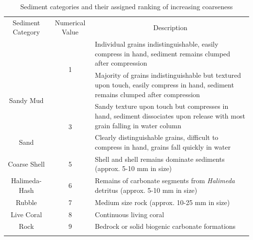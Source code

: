 \begin{table}[ht]
  \centering
  \caption{Sediment categories and their assigned ranking of increasing coarseness}
    \begin{tabular}{ccp{22em}}
\hline\noalign{\smallskip}



    Sediment Category & Numerical Value & \multicolumn{1}{c}{\centering Description} \\
        \noalign{\smallskip}\hline\noalign{\smallskip}
    \multicolumn{1}{c}{\multirow{2}[1]{*}{Mud}}   & \multicolumn{1}{c}{\multirow{2}[1]{*}{1}}     & Individual grains indistinguishable, easily compress in hand, sediment remains clumped after compression \\
    \multicolumn{1}{c}{\multirow{2}[1]{*}{Sandy Mud}} & \multicolumn{1}{c}{\multirow{2}[1]{*}{2}}     & Majority of grains indistinguishable but textured upon touch, easily compress in hand, sediment remains clumped after compression \\
    \multicolumn{1}{c}{\multirow{2}[1]{*}{Muddy Sand}} & \multicolumn{1}{c}{\multirow{2}[1]{*}{3}}     & Sandy texture upon touch but compresses in hand, sediment dissociates upon release with most grain falling in water column  \\
    Sand  & 4     & Clearly distinguishable grains, difficult to compress in hand, grains fall quickly in water  \\
    Coarse Shell & 5     & Shell and shell remains dominate sediments (approx. 5-10 mm in size) \\
    Halimeda-Hash & 6     & Remains of carbonate segments from \textit{Halimeda} detritus (approx. 5-10 mm in size) \\
    Rubble & 7     & Medium size rock (approx. 10-25 mm in size) \\
    Live Coral & 8     & Continuous living coral \\
    Rock  & 9     & Bedrock or solid biogenic carbonate formations \\
            \noalign{\smallskip}\hline\noalign{\smallskip}
        \end{tabular}

\end{table}






